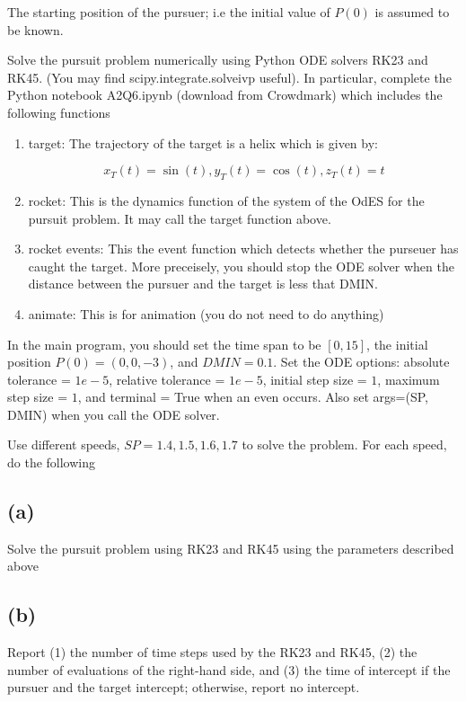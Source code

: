 \documentclass[11pt]{article}
\begin{document}
The starting position of the pursuer; i.e the initial value of $P(0)$ is assumed to be known.

Solve the pursuit problem numerically using Python ODE solvers RK23 and RK45. (You may find scipy.integrate.solveivp useful). In particular, complete the Python notebook A2Q6.ipynb (download from Crowdmark) which includes the following functions

\begin{enumerate}
  \item target: The trajectory of the target is a helix which is given by:
  
  \[ x_T(t) = \sin(t), y_T(t) = \cos(t), z_T(t) = t \]

  \item rocket: This is the dynamics function of the system of the OdES for the pursuit problem. It may call the target function above.
  \item rocket events: This the event function which detects whether the purseuer has caught the target. More preceisely, you should stop the ODE solver when the distance between the pursuer and the target is less that DMIN.
  \item animate: This is for animation (you do not need to do anything)
\end{enumerate}

In the main program, you should set the time span to be $[0, 15]$, the initial position $P(0) = (0, 0, -3)$, and $DMIN=0.1$. Set the ODE options: absolute tolerance = $1e-5$, relative tolerance = $1e-5$, initial step size = $1$, maximum step size = $1$, and terminal = True when an even occurs. Also set args=(SP, DMIN) when you call the ODE solver.

Use different speeds, $SP = 1.4, 1.5, 1.6, 1.7$ to solve the problem. For each speed, do the following

\subsection{(a)} Solve the pursuit problem using RK23 and RK45 using the parameters described above

\subsection{(b)} Report (1) the number of time steps used by the RK23 and RK45, (2) the number of evaluations of the right-hand side, and (3) the time of intercept if the pursuer and the target intercept; otherwise, report no intercept.
\end{document}

